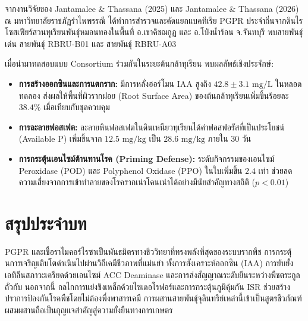 \begin{application}
จากงานวิจัยของ Jantamalee \& Thassana (2025) \cite{jantamalee_2025} และ Jantamalee \& Thassana (2026) \cite{jantamalee_2026_biotech} ณ มหาวิทยาลัยราชภัฏรำไพพรรณี ได้ทำการสำรวจและคัดแยกแบคทีเรีย PGPR ประจำถิ่นจากดินไรโซสเฟียร์สวนทุเรียนพันธุ์หมอนทองในพื้นที่ อ.เขาคิชฌกูฏ และ อ.โป่งน้ำร้อน จ.จันทบุรี พบสายพันธุ์เด่น  สายพันธุ์ RBRU-B01 และ  สายพันธุ์ RBRU-A03 

เมื่อนำมาทดสอบแบบ Consortium ร่วมกันในระยะต้นกล้าทุเรียน พบผลลัพธ์เชิงประจักษ์:
\begin{itemize}
    \item \textbf{การสร้างออกซินและการแตกราก:} มีการหลั่งฮอร์โมน IAA สูงถึง $42.8 \pm 3.1\text{ mg/L}$ ในหลอดทดลอง ส่งผลให้พื้นที่ผิวรากฝอย (Root Surface Area) ของต้นกล้าทุเรียนเพิ่มขึ้นร้อยละ $38.4\%$ เมื่อเทียบกับชุดควบคุม
    \item \textbf{การละลายฟอสเฟต:} ละลายหินฟอสเฟตในดินเหนียวทุเรียนได้ค่าฟอสฟอรัสที่เป็นประโยชน์ (Available P) เพิ่มขึ้นจาก $12.5\text{ mg/kg}$ เป็น $28.6\text{ mg/kg}$ ภายใน 30 วัน
    \item \textbf{การกระตุ้นเอนไซม์ต้านทานโรค (Priming Defense):} ระดับกิจกรรมของเอนไซม์ Peroxidase (POD) และ Polyphenol Oxidase (PPO) ในใบเพิ่มขึ้น $2.4$ เท่า ช่วยลดความเสี่ยงจากการเข้าทำลายของโรครากเน่าโคนเน่าได้อย่างมีนัยสำคัญทางสถิติ ($p < 0.01$)
\end{itemize}
\end{application}

\section*{สรุปประจำบท}

PGPR และเชื้อราไมคอร์ไรซาเป็นพันธมิตรทางชีววิทยาที่ทรงพลังที่สุดของระบบรากพืช การกระตุ้นการเจริญเติบโตดำเนินไปผ่านวิถีเคมีชีวภาพที่แม่นยำ ทั้งการสังเคราะห์ออกซิน (IAA) การยับยั้งเอทิลีนสภาวะเครียดด้วยเอนไซม์ ACC Deaminase และการส่งสัญญาณระดับยีนระหว่างพืชตระกูลถั่วกับ  นอกจากนี้ กลไกการแย่งชิงเหล็กด้วยไซเดอโรฟอร์และการกระตุ้นภูมิคุ้มกัน ISR ช่วยสร้างปราการป้องกันโรคพืชโดยไม่ต้องพึ่งพาสารเคมี การผสานสายพันธุ์จุลินทรีย์เหล่านี้เข้าเป็นสูตรชีวภัณฑ์ผสมผสานถือเป็นกุญแจสำคัญสู่ความยั่งยืนทางการเกษตร


